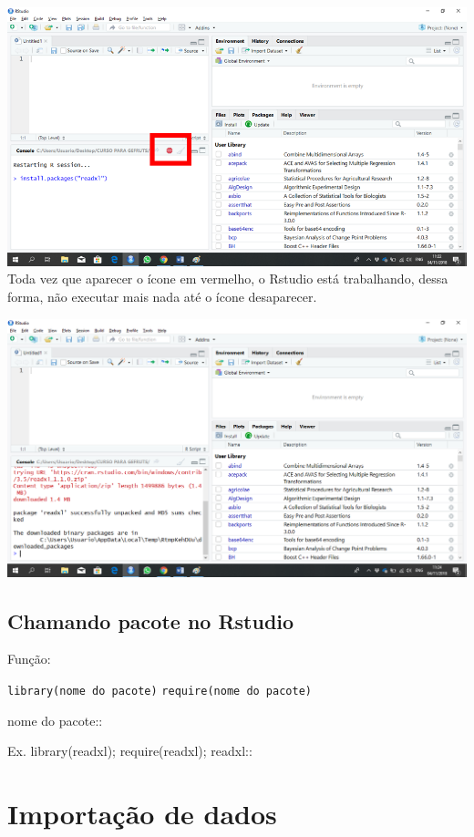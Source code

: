 \documentclass[
]{book}
\begin{document}
\includegraphics{install16.png}
Toda vez que aparecer o ícone em vermelho, o Rstudio está trabalhando, dessa forma, não executar mais nada até o ícone desaparecer.

\includegraphics{install15.png}

\hypertarget{chamando-pacote-no-rstudio}{%
\section{Chamando pacote no Rstudio}\label{chamando-pacote-no-rstudio}}

Função:

\texttt{library(nome\ do\ pacote)}
\texttt{require(nome\ do\ pacote)}

nome do pacote::

Ex. library(readxl); require(readxl); readxl::

\hypertarget{importauxe7uxe3o-de-dados}{%
\chapter{Importação de dados}\label{importauxe7uxe3o-de-dados}}
\end{document}
